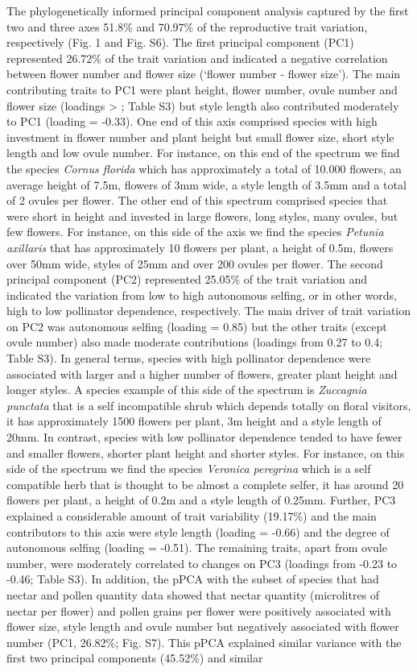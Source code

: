 \documentclass[
  12pt,
  a4paper,
]{article}
\begin{document}
The phylogenetically informed principal component analysis captured by the first two and three axes 51.8\% and 70.97\% of the reproductive trait variation, respectively (Fig. 1 and Fig. S6). The first principal component (PC1) represented 26.72\% of the trait variation and indicated a negative correlation between flower number and flower size (`flower number - flower size'). The main contributing traits to PC1 were plant height, flower number, ovule number and flower size (loadings \textgreater{} \textbar; Table S3) but style length also contributed moderately to PC1 (loading = -0.33). One end of this axis comprised species with high investment in flower number and plant height but small flower size, short style length and low ovule number. For instance, on this end of the spectrum we find the species \emph{Cornus florida} which has approximately a total of 10.000 flowers, an average height of 7.5m, flowers of 3mm wide, a style length of 3.5mm and a total of 2 ovules per flower. The other end of this spectrum comprised species that were short in height and invested in large flowers, long styles, many ovules, but few flowers. For instance, on this side of the axis we find the species \emph{Petunia axillaris} that has approximately 10 flowers per plant, a height of 0.5m, flowers over 50mm wide, styles of 25mm and over 200 ovules per flower. The second principal component (PC2) represented 25.05\% of the trait variation and indicated the variation from low to high autonomous selfing, or in other words, high to low pollinator dependence, respectively. The main driver of trait variation on PC2 was autonomous selfing (loading = 0.85) but the other traits (except ovule number) also made moderate contributions (loadings from 0.27 to 0.4; Table S3). In general terms, species with high pollinator dependence were associated with larger and a higher number of flowers, greater plant height and longer styles. A species example of this side of the spectrum is \emph{Zuccagnia punctata} that is a self incompatible shrub which depends totally on floral visitors, it has approximately 1500 flowers per plant, 3m height and a style length of 20mm. In contrast, species with low pollinator dependence tended to have fewer and smaller flowers, shorter plant height and shorter styles. For instance, on this side of the spectrum we find the species \emph{Veronica peregrina} which is a self compatible herb that is thought to be almost a complete selfer, it has around 20 flowers per plant, a height of 0.2m and a style length of 0.25mm. Further, PC3 explained a considerable amount of trait variability (19.17\%) and the main contributors to this axis were style length (loading = -0.66) and the degree of autonomous selfing (loading = -0.51). The remaining traits, apart from ovule number, were moderately correlated to changes on PC3 (loadings from -0.23 to -0.46; Table S3). In addition, the pPCA with the subset of species that had nectar and pollen quantity data showed that nectar quantity (microlitres of nectar per flower) and pollen grains per flower were positively associated with flower size, style length and ovule number but negatively associated with flower number (PC1, 26.82\%; Fig. S7). This pPCA explained similar variance with the first two principal components (45.52\%) and similar 
\end{document}
